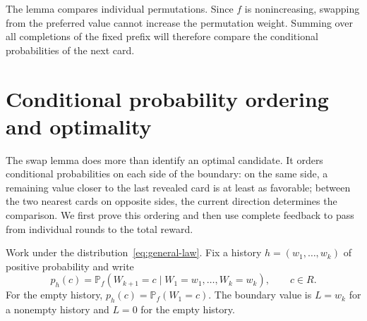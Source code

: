 \documentclass[11pt,reqno]{amsart}
\numberwithin{equation}{section}
\theoremstyle{definition}
\theoremstyle{remark}
\begin{document}
The lemma compares individual permutations. Since $f$ is nonincreasing, swapping from the preferred value cannot increase the permutation weight. Summing over all completions of the fixed prefix will therefore compare the conditional probabilities of the next card.
\section{Conditional probability ordering and optimality}\label{sec:optimality}
The swap lemma does more than identify an optimal candidate. It orders conditional probabilities on each side of the boundary: on the same side, a remaining value closer to the last revealed card is at least as favorable; between the two nearest cards on opposite sides, the current direction determines the comparison. We first prove this ordering and then use complete feedback to pass from individual rounds to the total reward.

Work under the distribution~\eqref{eq:general-law}. Fix a history $h=(w_1,\ldots,w_k)$ of positive probability and write
\[
 p_h(c)=\mathbb P_f(W_{k+1}=c\mid W_1=w_1,\ldots,W_k=w_k),
 \qquad c\in R.
\]
For the empty history, $p_h(c)=\mathbb P_f(W_1=c)$. The boundary value is $L=w_k$ for a nonempty history and $L=0$ for the empty history.
\end{document}
